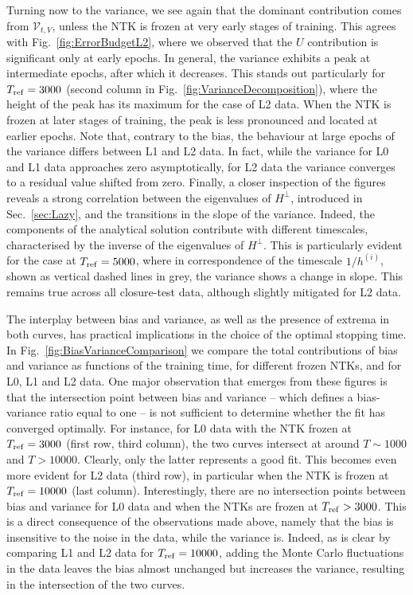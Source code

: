 Turning now to the variance, we see again that the dominant contribution comes
from $\mathcal{V}_{t,V}$, unless the NTK is frozen at very early stages of
training. This agrees with Fig.~\ref{fig:ErrorBudgetL2}, where we observed that
the $U$ contribution is significant only at early epochs. In
general, the variance exhibits a peak at intermediate epochs, after which it
decreases. This stands out particularly for $T_{\rm ref} = 3000$ (second column
in Fig.~\ref{fig:VarianceDecomposition}), where the height of the peak has its
maximum for the case of L2 data. When the NTK is frozen at later stages of
training, the peak is less pronounced and located at earlier epochs. Note that,
contrary to the bias, the behaviour at large epochs of the variance differs
between L1 and L2 data. In fact, while the variance for L0 and L1 data
approaches zero asymptotically, for L2 data the variance converges to a residual
value shifted from zero. Finally, a closer inspection of the figures reveals a
strong correlation between the eigenvalues of $H^\perp$, introduced in
Sec.~\ref{sec:Lazy}, and the transitions in the slope of the variance. Indeed,
the components of the analytical solution contribute with different timescales,
characterised by the inverse of the eigenvalues of $H^\perp$. This is
particularly evident for the case at $T_{\rm ref}=5000$, where in correspondence
of the timescale $1/h^{(i)}$, shown as vertical dashed lines in grey, the variance
shows a change in slope. This remains true across all closure-test data,
although slightly mitigated for L2 data.

The interplay between bias and variance, as well as the presence of extrema in
both curves, has practical implications in the choice of the optimal
stopping time. In Fig.~\ref{fig:BiasVarianceComparison} we compare the total
contributions of bias and variance as functions of the training time, for
different frozen NTKs, and for L0, L1 and L2 data. One major observation that
emerges from these figures is that the intersection point between bias and
variance -- which defines a bias-variance ratio equal to one -- is not
sufficient to determine whether the fit has converged optimally. For instance,
for L0 data with the NTK frozen at $T_{\rm ref}=3000$ (first row, third column),
the two curves intersect at around $T \sim 1000$ and $T> 10000$. Clearly, only
the latter represents a good fit. This becomes even more evident for L2 data
(third row), in particular when the NTK is frozen at $T_{\rm ref}=10000$ (last
column). Interestingly, there are no intersection points between bias and
variance for L0 data and when the NTKs are frozen at $T_{\rm ref} > 3000$. This
is a direct consequence of the observations made above, namely that the bias is
insensitive to the noise in the data, while the variance is. Indeed, as is clear
by comparing L1 and L2 data for $T_{\rm ref} = 10000$, adding the Monte Carlo
fluctuations in the data leaves the bias almost unchanged but increases the
variance, resulting in the intersection of the two curves.

